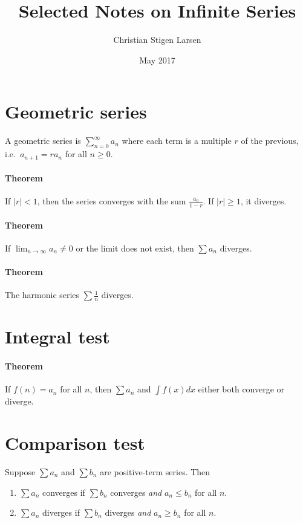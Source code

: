 \documentclass[a4paper,twocolumn,10pt]{article}
\title{Selected Notes on Infinite Series}
\author{Christian Stigen Larsen}
\date{May 2017}
\begin{document}
  \maketitle
  \section{Geometric series}
  A geometric series is $\sum_{n=0}^{\infty} a_n$ where each term is a multiple
  $r$ of the previous, i.e.~$a_{n+1} = ra_n$ for all $n \geq 0$.

  \paragraph{Theorem} If $|r| < 1$, then the series converges with the sum
  $\frac{a_0}{1-r}$. If $|r| \geq 1$, it diverges.

  \paragraph{Theorem} If $\lim_{n\to\infty}{a_n}\neq 0$ or the limit does not
  exist, then $\sum a_n$ diverges.

  \paragraph{Theorem} The harmonic series $\sum \frac{1}{n}$ diverges.

  \section{Integral test}
  \paragraph{Theorem} If $f(n) = a_n$ for all $n$, then $\sum a_n$ and $\int
  f(x) dx$ either both converge or diverge.

  \section{Comparison test}
  Suppose $\sum a_n$ and $\sum b_n$ are positive-term series. Then
  \begin{enumerate}
    \item $\sum a_n$ converges if $\sum b_n$ converges \textit{and} $a_n \leq
      b_n$ for all $n$.
    \item $\sum a_n$ diverges if $\sum b_n$ diverges \textit{and} $a_n \geq
      b_n$ for all $n$.
  \end{enumerate}
\end{document}
